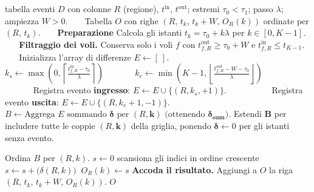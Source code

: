 \begin{algorithm}[H]
  \caption{Occupancy per regione.}
  \label{alg:occupancy-anyW-diff}
    \vspace{-1.5em} %
  \begin{algorithmic}[1]
    \Require tabella eventi $D$ con colonne $R$ (regione), $t^{\mathrm{in}}$, $t^{\mathrm{out}}$; estremi $\tau_0<\tau_1$; passo $\lambda$; ampiezza $W>0$.
    \Ensure Tabella $O$ con righe $(R,\,t_k,\,t_k+W,\,O_R(k))$ ordinate per $(R,\,t_k)$.
    \EnsureEndSkip{}
    \State \textbf{Preparazione} Calcola gli istanti $t_k = \tau_0 + k \lambda$ per $k \in [0, K{-}1]$.
    \State \textbf{Filtraggio dei voli.} Conserva solo i voli $f$ con $t^{\mathrm{out}}_{f,R} \ge \tau_0+W$ e $t^{\mathrm{in}}_{f,R} \le t_{K-1}$.
    \State Inizializza l'array di differenze $E \gets [\ ]$.
        \State \quad $k_{s} \gets \max\left(0, \left\lceil \frac{t^{\mathrm{in}}_{f,R} - \tau_0}{\lambda} \right\rceil\right)$
        \State \quad $k_{e} \gets \min\left(K{-}1, \left\lfloor \frac{t^{\mathrm{out}}_{f,R} - W - \tau_0}{\lambda} \right\rfloor\right)$
            \State Registra evento \textbf{ingresso}: $E \gets E \cup \{(R, k_{s}, +1)\}$.
            \State Registra evento \textbf{uscita}: $E \gets E \cup \{(R, k_{e} + 1, -1)\}$.
        \EndIf
    \EndFor
    \State $B \gets \text{Aggrega } E \text{ sommando } \mathbf{\delta} \text{ per } (R, \mathbf{k}) \text{ (ottenendo } \mathbf{\delta_{sum}}).$
    \State Estendi $\mathbf{B}$ per includere tutte le coppie $(R, \mathbf{k})$ della griglia, ponendo $\mathbf{\delta} \gets 0$ per gli istanti senza evento.
  
    \State Ordina $B$ per $(R,k)$.
      \State $s \gets 0$
       \Comment scansiona gli indici in ordine crescente
        \State $s \gets s + \bigl(\delta(R,k))\ $
        \State $O_R(k) \gets s$
      \EndFor
      \State \textbf{Accoda il risultato.} Aggiungi a $O$ la riga $(R,\,t_k,\,t_k{+}W,\,O_R(k))$.
    \EndFor
\State \Return $O$
   
  \end{algorithmic}
\end{algorithm}